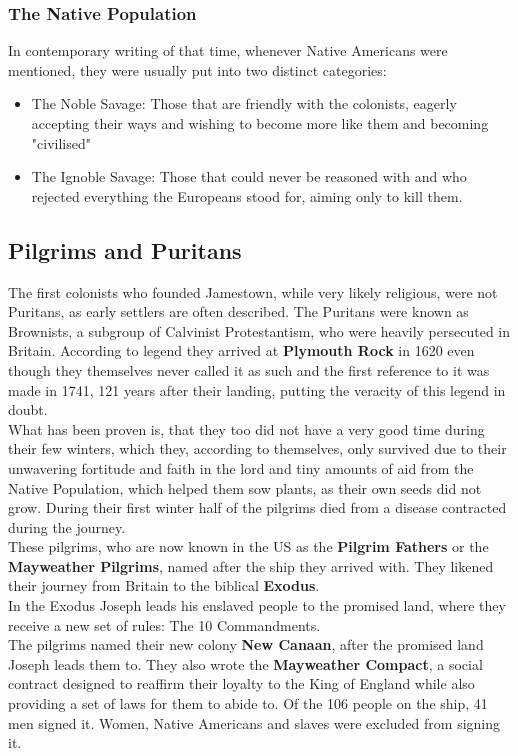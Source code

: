 \documentclass{article}
\begin{document}
	\subsubsection{The Native Population}
	In contemporary writing of that time, whenever Native Americans were mentioned, they were usually put into two distinct categories:
	\begin{itemize}
		\item{The Noble Savage: Those that are friendly with the colonists, eagerly accepting their ways and wishing to become more like them and becoming "civilised"}
		\item{The Ignoble Savage: Those that could never be reasoned with and who rejected everything the Europeans stood for, aiming only to kill them.}
	\end{itemize}
	\subsection{Pilgrims and Puritans}
	The first colonists who founded Jamestown, while very likely religious, were not Puritans, as early settlers are often described. The Puritans were known as Brownists, a subgroup of Calvinist Protestantism, who were heavily persecuted in Britain. According to legend they arrived at \textbf{Plymouth Rock} in 1620 even though they themselves never called it as such and the first reference to it was  made in 1741, 121 years after their landing, putting the veracity of this legend in doubt. \\
	What has been proven is, that they too did not have a very good time during their few winters, which they, according to themselves, only survived due to their unwavering fortitude and faith in the lord and tiny amounts of aid from the Native Population, which helped them sow plants, as their own seeds did not grow. During their first winter half of the pilgrims died from a disease contracted during the journey. \\
	These pilgrims, who are now known in the US as the \textbf{Pilgrim Fathers} or the \textbf{Mayweather Pilgrims}, named after the ship they arrived with. They likened their journey from Britain to the biblical \textbf{Exodus}. \\
	In the Exodus Joseph leads his enslaved people to the promised land, where they receive a new set of rules: The 10 Commandments. \\
	The pilgrims named their new colony \textbf{New Canaan}, after the promised land Joseph leads them to. They also wrote the \textbf{Mayweather Compact}, a social contract designed to reaffirm their loyalty to the King of England while also providing a set of laws for them to abide to. Of the 106 people on the ship, 41 men signed it. Women, Native Americans and slaves were excluded from signing it. \\
\end{document}
